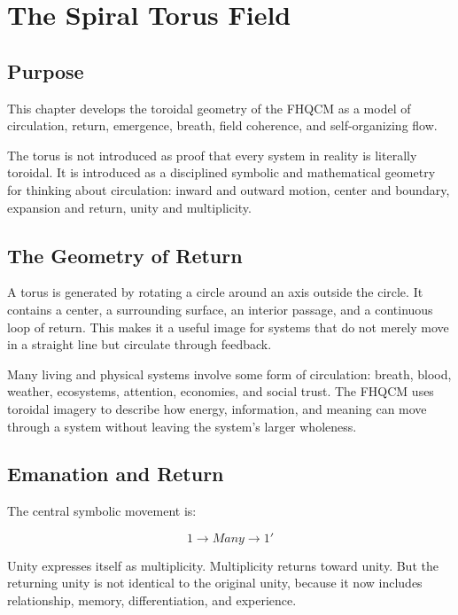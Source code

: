\chapter{The Spiral Torus Field}

\section{Purpose}

This chapter develops the toroidal geometry of the FHQCM as a model of circulation, return, emergence, breath, field coherence, and self-organizing flow.

The torus is not introduced as proof that every system in reality is literally toroidal. It is introduced as a disciplined symbolic and mathematical geometry for thinking about circulation: inward and outward motion, center and boundary, expansion and return, unity and multiplicity.


\section{The Geometry of Return}

A torus is generated by rotating a circle around an axis outside the circle. It contains a center, a surrounding surface, an interior passage, and a continuous loop of return. This makes it a useful image for systems that do not merely move in a straight line but circulate through feedback.

Many living and physical systems involve some form of circulation: breath, blood, weather, ecosystems, attention, economies, and social trust. The FHQCM uses toroidal imagery to describe how energy, information, and meaning can move through a system without leaving the system's larger wholeness.

\section{Emanation and Return}

The central symbolic movement is:

\[
1 \rightarrow Many \rightarrow 1'
\]

Unity expresses itself as multiplicity. Multiplicity returns toward unity. But the returning unity is not identical to the original unity, because it now includes relationship, memory, differentiation, and experience.

